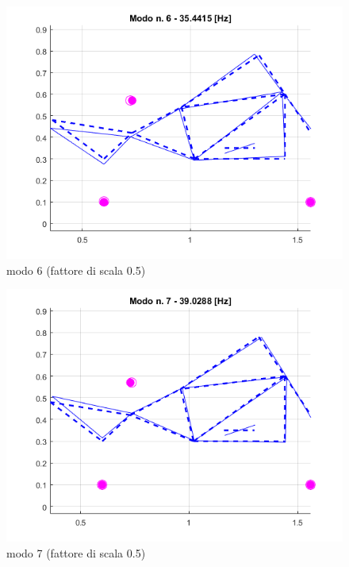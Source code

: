 \documentclass[12pt, a4paper]{article}
\begin{document}
	\begin{figure}[h]
		\centering
		\includegraphics[scale=0.6]{modo_6}
		\caption{modo 6 (fattore di scala 0.5)}
	\end{figure}
	\begin{figure}[h]
		\centering
		\includegraphics[scale=0.6]{modo_7}
		\caption{modo 7 (fattore di scala 0.5)}
	\end{figure}
\end{document}
